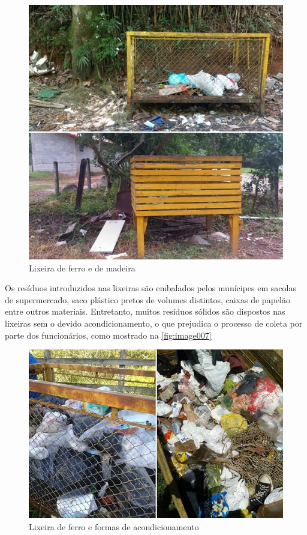 	\begin{figure}
		\centering
		\includegraphics[width=0.75\linewidth]{produtos/prodtres/image006}
		\caption{Lixeira de ferro e de madeira}
		\label{fig:image006}
	\end{figure}
	
	Os resíduos introduzidos nas lixeiras são embalados pelos munícipes em sacolas de supermercado, saco plástico pretos de volumes distintos, caixas de papelão entre outros materiais. Entretanto, muitos resíduos sólidos são dispostos nas lixeiras sem o devido acondicionamento, o que prejudica o processo de coleta por parte dos funcionários, como mostrado na \autoref{fig:image007}
	
	\begin{figure}
		\centering
		\includegraphics[width=0.75\linewidth]{produtos/prodtres/image007}
		\caption{Lixeira de ferro e formas de acondicionamento}
		\label{fig:image007}
	\end{figure}
		
